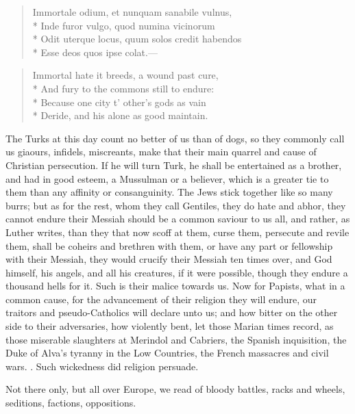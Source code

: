 {\begin{latin}
\begin{verse}
Immortale odium, et nunquam sanabile vulnus,\\*
Inde furor vulgo, quod numina vicinorum\\*
Odit uterque locus, quum solos credit habendos\\*
Esse deos quos ipse colat.---
\end{verse}
\end{latin}

\begin{verse}
Immortal hate it breeds, a wound past cure,\\*
And fury to the commons still to endure:\\*
Because one city t' other's gods as vain\\*
Deride, and his alone as good maintain.
\end{verse}

The Turks at this day count no better of us than of dogs, so they
commonly call us giaours, infidels, miscreants, make that their main
quarrel and cause of Christian persecution. If he will turn Turk, he
shall be entertained as a brother, and had in good esteem, a Mussulman
or a believer, which is a greater tie to them than any affinity or
consanguinity. The Jews stick together like so many burrs; but as for
the rest, whom they call Gentiles, they do hate and abhor, they cannot
endure their Messiah should be a common saviour to us all, and rather,
as Luther writes, than they that now scoff at them, curse them,
persecute and revile them, shall be coheirs and brethren with them, or
have any part or fellowship with their Messiah, they would crucify
their Messiah ten times over, and God himself, his angels, and all his
creatures, if it were possible, though they endure a thousand hells for
it. Such is their malice towards us. Now for Papists, what in a common
cause, for the advancement of their religion they will endure, our
traitors and pseudo-Catholics will declare unto us; and how bitter on
the other side to their adversaries, how violently bent, let those
Marian times record, as those miserable slaughters at Merindol and
Cabriers, the Spanish inquisition, the Duke of Alva's tyranny in the
Low Countries, the French massacres and civil wars. . Such wickedness did religion persuade.

Not there only, but all over Europe, we read of bloody battles, racks
and wheels, seditions, factions, oppositions.

}
